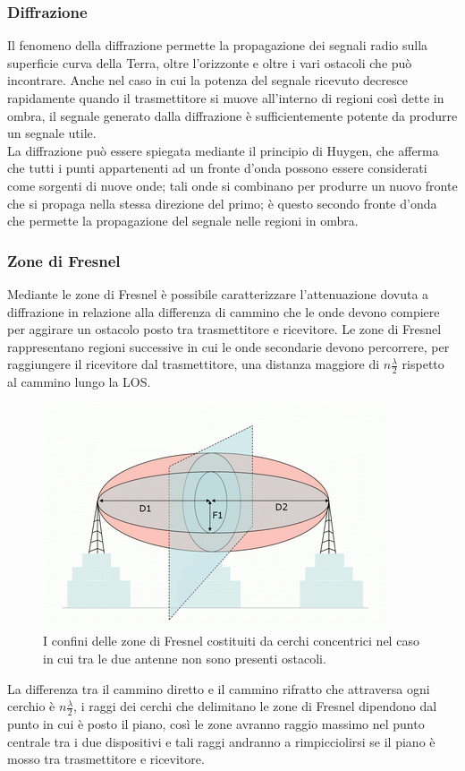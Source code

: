 \subsubsection{Diffrazione}
Il fenomeno della diffrazione permette la propagazione dei segnali radio sulla
superficie curva della Terra, oltre l'orizzonte e oltre 
i vari ostacoli che può incontrare. Anche nel caso in cui la potenza del segnale ricevuto decresce rapidamente quando il trasmettitore 
si muove all'interno di regioni così dette in ombra, il segnale generato dalla diffrazione è sufficientemente potente da produrre un 
segnale utile. \\
La diffrazione può essere spiegata mediante il principio di Huygen, che afferma che tutti i punti appartenenti ad un fronte d'onda 
possono essere considerati come sorgenti di nuove onde; tali onde si combinano per produrre un
nuovo fronte che si propaga nella 
stessa direzione del primo; è questo secondo
fronte d’onda che permette la propagazione del segnale nelle regioni in ombra. \\

\subsubsection*{Zone di Fresnel}
Mediante le zone di Fresnel è possibile caratterizzare l'attenuazione dovuta a diffrazione in relazione alla differenza di cammino 
che le onde
devono compiere per aggirare un ostacolo posto tra trasmettitore e ricevitore.
Le zone di Fresnel rappresentano regioni successive in cui le onde secondarie
devono percorrere, per raggiungere il ricevitore 
dal trasmettitore, una distanza
maggiore di $n\frac{\lambda}{2}$ rispetto al cammino lungo la \ac{LOS}.
\begin{figure}[h]
\centering
\includegraphics[height=0.5\textwidth]{Immagini/fresnel}
\caption{I confini delle zone di Fresnel costituiti da cerchi concentrici nel caso in cui tra le due antenne non sono presenti ostacoli.}
\label{img:fresnel}
\end{figure}
La differenza tra il cammino diretto e il cammino rifratto che attraversa ogni cerchio è $n\frac{\lambda}{2}$, i raggi dei cerchi che 
delimitano le zone di Fresnel dipendono dal punto in cui è posto il piano, così le zone avranno raggio massimo nel punto centrale tra 
i due dispositivi e tali raggi andranno a rimpicciolirsi se il piano è mosso tra trasmettitore e ricevitore. \\

